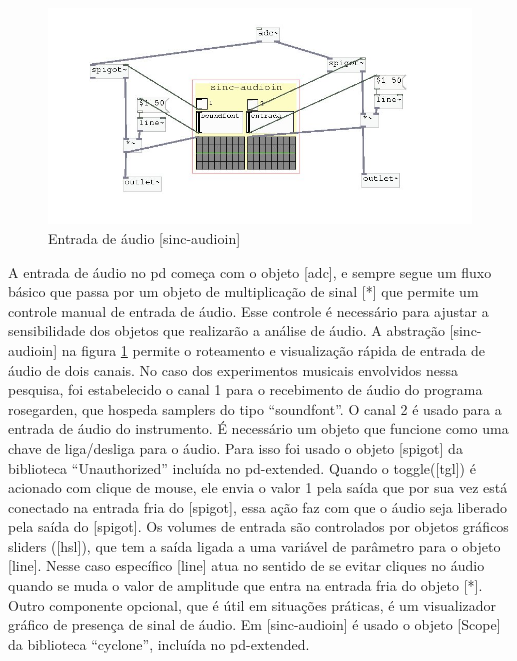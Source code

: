 \documentclass{ppgmus}
\begin{document}
\begin{figure}
\includegraphics[scale=.55]{audioin}
\caption{Entrada de áudio [sinc-audioin]}
\label{audioin}
\end{figure}

A entrada de áudio no pd começa com o objeto  [adc\texttildelow], e sempre segue um fluxo
básico que passa por um objeto de multiplicação de sinal [*\texttildelow] que permite um
controle manual de entrada de áudio. Esse controle é necessário para ajustar 
a sensibilidade dos objetos que realizarão a análise de áudio. A abstração 
[sinc-audioin] na figura \ref{audioin} permite o roteamento e visualização rápida 
de entrada de áudio de dois canais. No caso dos experimentos musicais envolvidos 
nessa pesquisa, foi estabelecido o canal 1 para o recebimento de áudio do programa 
rosegarden, que hospeda samplers do tipo ``soundfont''. O canal 2 é usado para 
a entrada de áudio do instrumento. É necessário um objeto que funcione como uma chave de
liga/desliga para o áudio. Para isso foi usado o objeto [spigot\texttildelow] da biblioteca
``Unauthorized'' incluída no pd-extended.
 Quando o toggle([tgl]) é acionado com clique de mouse,
ele envia o valor 1 pela saída que por sua vez está conectado na entrada fria do
[spigot\texttildelow], essa ação faz com que o áudio seja liberado pela saída do [spigot\texttildelow].
Os volumes de entrada são controlados por objetos gráficos sliders ([hsl]), que tem
a saída ligada a uma variável de parâmetro para o objeto [line\texttildelow]. Nesse caso específico
[line\texttildelow] atua no sentido de se evitar cliques no áudio quando se muda o valor de 
amplitude que entra na entrada fria do objeto [*\texttildelow]. Outro componente
opcional, que é útil em situações práticas, é um visualizador gráfico de presença de sinal
de áudio. Em [sinc-audioin] é usado o objeto [Scope\texttildelow] da biblioteca ``cyclone'', 
incluída no pd-extended.
\end{document}
